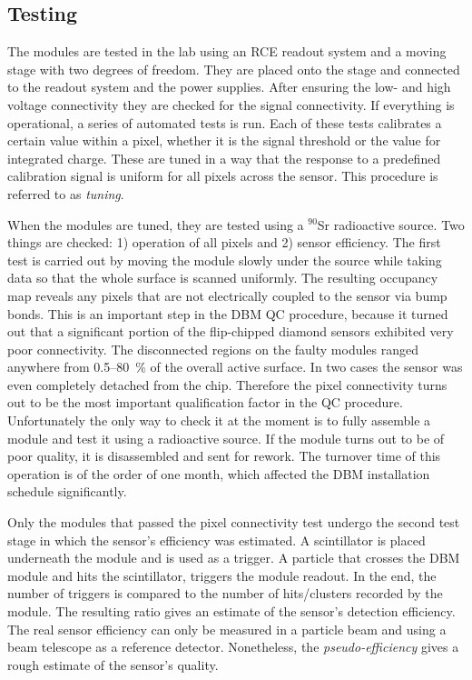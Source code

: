 \documentclass[twoside,12pt]{packages/mytustyle}  %
\begin{document}
\subsection{Testing}
The modules are tested in the lab using an RCE readout system and a moving stage with two degrees of freedom. They are placed onto the stage and connected to the readout system and the power supplies. After ensuring the low- and high voltage connectivity they are checked for the signal connectivity. If everything is operational, a series of automated tests is run. Each of these tests calibrates a certain value within a pixel, whether it is the signal threshold or the value for integrated charge. These are tuned in a way that the response to a predefined calibration signal is uniform for all pixels across the sensor. This procedure is referred to as \emph{tuning}. 

When the modules are tuned, they are tested using a $^{90}$Sr radioactive source. Two things are checked: 1) operation of all pixels and 2) sensor efficiency. The first test is carried out by moving the module slowly under the source while taking data so that the whole surface is scanned uniformly. The resulting occupancy map reveals any pixels that are not electrically coupled to the sensor via bump bonds. This is an important step in the DBM QC procedure, because it turned out that a significant portion of the flip-chipped diamond sensors exhibited very poor connectivity. The disconnected regions on the faulty modules ranged anywhere from 0.5--80~\% of the overall active surface. In two cases the sensor was even completely detached from the chip. Therefore the pixel connectivity turns out to be the most important qualification factor in the QC procedure. Unfortunately the only way to check it at the moment is to fully assemble a module and test it using a radioactive source. If the module turns out to be of poor quality, it is disassembled and sent for rework. The turnover time of this operation is of the order of one month, which affected the DBM installation schedule significantly. 

Only the modules that passed the pixel connectivity test undergo the second test stage in which the sensor's efficiency was estimated. A scintillator is placed underneath the module and is used as a trigger. A particle that crosses the DBM module and hits the scintillator, triggers the module readout. In the end, the number of triggers is compared to the number of hits/clusters recorded by the module. The resulting ratio gives an estimate of the sensor's detection efficiency. The real sensor efficiency can only be measured in a particle beam and using a beam telescope as a reference detector. Nonetheless, the \emph{pseudo-efficiency} gives a rough estimate of the sensor's quality. 
\end{document}
